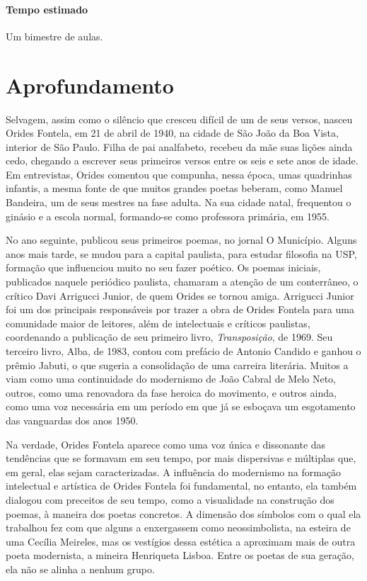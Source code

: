 \documentclass[12pt]{extarticle}
\begin{document}
\paragraph{Tempo estimado} Um bimestre de aulas.

\section{Aprofundamento}

Selvagem, assim como o silêncio que cresceu difícil de um de seus
versos, nasceu Orides Fontela, em 21 de abril de 1940, na cidade de São
João da Boa Vista, interior de São Paulo. Filha de pai analfabeto,
recebeu da mãe suas lições ainda cedo, chegando a escrever seus
primeiros versos entre os seis e sete anos de idade. Em entrevistas,
Orides comentou que compunha, nessa época, umas quadrinhas infantis, a
mesma fonte de que muitos grandes poetas beberam, como Manuel Bandeira,
um de seus mestres na fase adulta. Na sua cidade natal, frequentou o
ginásio e a escola normal, formando-se como professora primária, em
1955.

No ano seguinte, publicou seus primeiros poemas, no jornal O Município.
Alguns anos mais tarde, se mudou para a capital paulista, para estudar
filosofia na USP, formação que influenciou muito no seu fazer poético.
Os poemas iniciais, publicados naquele periódico paulista, chamaram a
atenção de um conterrâneo, o crítico Davi Arrigucci Junior, de quem
Orides se tornou amiga. Arrigucci Junior foi um dos principais
responsáveis por trazer a obra de Orides Fontela para uma comunidade
maior de leitores, além de intelectuais e críticos paulistas,
coordenando a publicação de seu primeiro livro, \emph{Transposição}, de
1969. Seu terceiro livro, Alba, de 1983, contou com prefácio de Antonio
Candido e ganhou o prêmio Jabuti, o que sugeria a consolidação de uma
carreira literária. Muitos a viam como uma continuidade do modernismo de
João Cabral de Melo Neto, outros, como uma renovadora da fase heroica do
movimento, e outros ainda, como uma voz necessária em um período em que
já se esboçava um esgotamento das vanguardas dos anos 1950.




Na verdade, Orides Fontela aparece como uma voz única e dissonante das
tendências que se formavam em seu tempo, por mais dispersivas e
múltiplas que, em geral, elas sejam caracterizadas. A influência do
modernismo na formação intelectual e artística de Orides Fontela foi
fundamental, no entanto, ela também dialogou com preceitos de seu tempo,
como a visualidade na construção dos poemas, à maneira dos poetas
concretos. A dimensão dos símbolos com o qual ela trabalhou fez com que
alguns a enxergassem como neossimbolista, na esteira de uma Cecília
Meireles, mas os vestígios dessa estética a aproximam mais de outra
poeta modernista, a mineira Henriqueta Lisboa. Entre os poetas de sua
geração, ela não se alinha a nenhum grupo.
\end{document}
